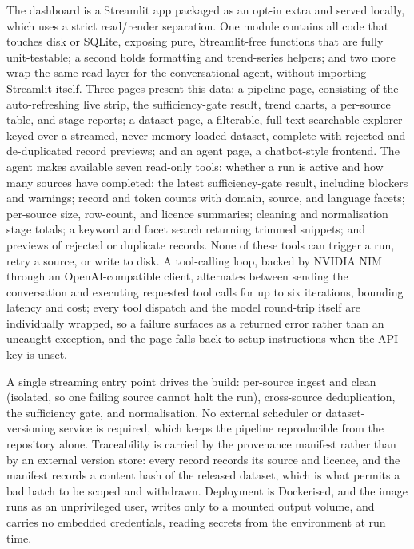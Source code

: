\documentclass[conference]{IEEEtran}
\begin{document}
The dashboard is a Streamlit app packaged as an opt-in extra and served locally, which uses a strict read/render separation. One module contains all code that touches disk or SQLite, exposing pure, Streamlit-free functions that are fully unit-testable; a second holds formatting and trend-series helpers; and two more wrap the same read layer for the conversational agent, without importing Streamlit itself. Three pages present this data: a pipeline page, consisting of the auto-refreshing live strip, the sufficiency-gate result, trend charts, a per-source table, and stage reports; a dataset page, a filterable, full-text-searchable explorer keyed over a streamed, never memory-loaded dataset, complete with rejected and de-duplicated record previews; and an agent page, a chatbot-style frontend. The agent makes available seven read-only tools: whether a run is active and how many sources have completed; the latest sufficiency-gate result, including blockers and warnings; record and token counts with domain, source, and language facets; per-source size, row-count, and licence summaries; cleaning and normalisation stage totals; a keyword and facet search returning trimmed snippets; and previews of rejected or duplicate records. None of these tools can trigger a run, retry a source, or write to disk. A tool-calling loop, backed by NVIDIA NIM through an OpenAI-compatible client, alternates between sending the conversation and executing requested tool calls for up to six iterations, bounding latency and cost; every tool dispatch and the model round-trip itself are individually wrapped, so a failure surfaces as a returned error rather than an uncaught exception, and the page falls back to setup instructions when the API key is unset.

A single streaming entry point drives the build: per-source ingest and clean (isolated, so one failing source cannot halt the run), cross-source deduplication, the sufficiency gate, and normalisation. No external scheduler or dataset-versioning service is required, which keeps the pipeline reproducible from the repository alone. Traceability is carried by the provenance manifest rather than by an external version store: every record records its source and licence, and the manifest records a content hash of the released dataset, which is what permits a bad batch to be scoped and withdrawn. Deployment is Dockerised, and the image runs as an unprivileged user, writes only to a mounted output volume, and carries no embedded credentials, reading secrets from the environment at run time.
\end{document}
